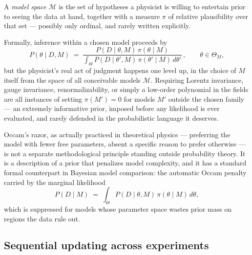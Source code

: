 \begin{definition}
A \emph{model space} $\mathcal{M}$ is the set of hypotheses a physicist is
    willing to entertain prior to seeing the data at hand, together with a
    measure $\pi$ of relative plausibility over that set --- possibly only
    ordinal, and rarely written explicitly.
\end{definition}

Formally, inference within a chosen model proceeds by
\begin{equation}
P(\theta \mid D, M) \;=\; \frac{P(D \mid \theta, M)\,\pi(\theta \mid M)}
    {\displaystyle\int_{\Theta} P(D \mid \theta', M)\,\pi(\theta' \mid M)\, d\theta'}
    \,, \qquad \theta \in \Theta_M,
\end{equation}
but the physicist's real act of judgment happens one level up, in the choice of
$M$ itself from the space of all conceivable models $\mathcal{M}$. Requiring
Lorentz invariance, gauge invariance, renormalizability, or simply a low-order
polynomial in the fields are all instances of setting $\pi(M') = 0$ for models
$M'$ outside the chosen family --- an extremely informative prior, imposed
before any likelihood is ever evaluated, and rarely defended in the
probabilistic language it deserves.

\begin{remark}
Occam's razor, as actually practiced in theoretical physics --- preferring the
    model with fewer free parameters, absent a specific reason to prefer
    otherwise --- is not a separate methodological principle standing outside
    probability theory. It is a description of a prior that penalizes model
    complexity, and it has a standard formal counterpart in Bayesian model
    comparison: the automatic Occam penalty carried by the marginal likelihood
\begin{equation}
P(D \mid M) \;=\; \int_{\Theta} P(D \mid \theta, M)\,\pi(\theta \mid M)\, d\theta,
\end{equation}
which is suppressed for models whose parameter space wastes prior mass on
    regions the data rule out.
\end{remark}

\subsection{Sequential updating across experiments}

